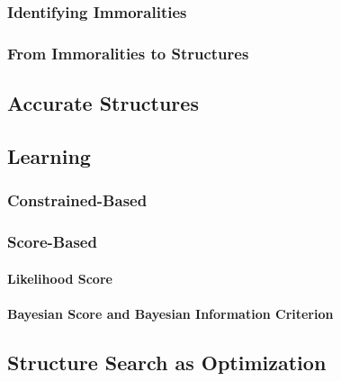             \subsubsection{Identifying Immoralities} %

            \subsubsection{From Immoralities to Structures} %

        \subsection{Accurate Structures} %

        \subsection{Learning} %

            \subsubsection{Constrained-Based} %

            \subsubsection{Score-Based} %

                \paragraph{Likelihood Score} %

                \paragraph{Bayesian Score and Bayesian Information Criterion} %

        \subsection{Structure Search as Optimization} %

